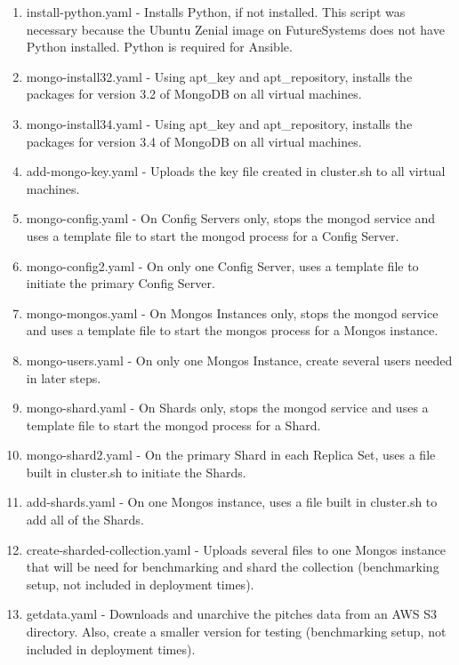 \documentclass[9pt,twocolumn,twoside]{../../styles/osajnl}
\begin{document}
\begin{enumerate}


\item install-python.yaml - Installs Python, if not installed.  This
script was necessary because the Ubuntu Zenial image on FutureSystems
does not have Python installed.  Python is required for Ansible.  

\item mongo-install32.yaml - Using apt\_key and apt\_repository,
installs the packages for version 3.2 of MongoDB on all virtual
machines.

\item mongo-install34.yaml - Using apt\_key and apt\_repository,
installs the packages for version 3.4 of MongoDB on all virtual
machines.

\item add-mongo-key.yaml - Uploads the key file created in cluster.sh
to all virtual machines.

\item mongo-config.yaml - On Config Servers only, stops the mongod
service and uses a template file to start the mongod process for a
Config Server.

\item mongo-config2.yaml - On only one Config Server, uses a template
file to initiate the primary Config Server.

\item mongo-mongos.yaml - On Mongos Instances only, stops the mongod
service and uses a template file to start the mongos process for a
Mongos instance.

\item mongo-users.yaml - On only one Mongos Instance, create several
users needed in later steps.

\item mongo-shard.yaml - On Shards only, stops the mongod service and
uses a template file to start the mongod process for a Shard.

\item mongo-shard2.yaml - On the primary Shard in each Replica Set,
uses a file built in cluster.sh to initiate the Shards.

\item add-shards.yaml - On one Mongos instance, uses a file built in
cluster.sh to add all of the Shards.

\item create-sharded-collection.yaml - Uploads several files to one
Mongos instance that will be need for benchmarking and shard the
collection (benchmarking setup, not included in deployment times).

\item getdata.yaml - Downloads and unarchive the pitches data from an
AWS S3 directory.  Also, create a smaller version for testing
(benchmarking setup, not included in deployment times). 

\end{enumerate}
\end{document}
